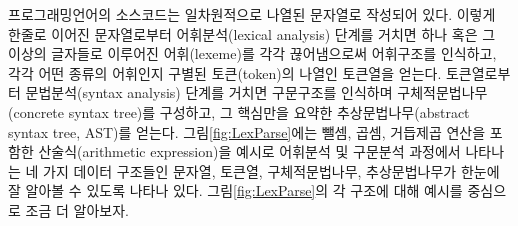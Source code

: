 프로그래밍언어의 소스코드는 일차원적으로 나열된 문자열로 작성되어 있다.
이렇게 한줄로 이어진 문자열로부터 어휘분석(lexical analysis) 단계를 거치면
하나 혹은 그 이상의 글자들로 이루어진 어휘(lexeme)를 각각 끊어냄으로써
어휘구조를 인식하고, 각각 어떤 종류의 어휘인지 구별된 토큰(token)의
나열인 토큰열을 얻는다. 토큰열로부터 문법분석(syntax analysis) 단계를
거치면 구문구조를 인식하며 구체적문법나무(concrete syntax tree)를 구성하고,
그 핵심만을 요약한 추상문법나무(abstract syntax tree, AST)를 얻는다.
그림\;\ref{fig:LexParse}에는 뺄셈, 곱셈, 거듭제곱 연산을 포함한
산술식(arithmetic expression)을 예시로 어휘분석 및 구문분석 과정에서
나타나는 네 가지 데이터 구조들인 문자열, 토큰열, 구체적문법나무,
추상문법나무가 한눈에 잘 알아볼 수 있도록 나타나 있다.
그림\;\ref{fig:LexParse}의 각 구조에 대해 예시를 중심으로 조금
더 알아보자.

